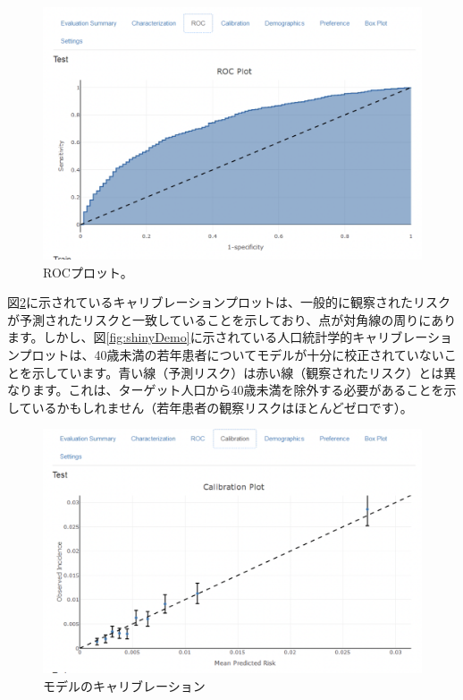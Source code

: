 \documentclass[
  11pt]{book}
\theoremstyle{definition}
\theoremstyle{definition}
\theoremstyle{definition}
\theoremstyle{definition}
\theoremstyle{remark}
\begin{document}
\begin{figure}

{\centering \includegraphics[width=1\linewidth]{images/PatientLevelPrediction/shiny/singleShiny/singleShinyRoc} 

}

\caption{ROCプロット。}\label{fig:shinyROC}
\end{figure}

図\ref{fig:shinyCal}に示されているキャリブレーションプロットは、一般的に観察されたリスクが予測されたリスクと一致していることを示しており、点が対角線の周りにあります。しかし、図\ref{fig:shinyDemo}に示されている人口統計学的キャリブレーションプロットは、40歳未満の若年患者についてモデルが十分に校正されていないことを示しています。青い線（予測リスク）は赤い線（観察されたリスク）とは異なります。これは、ターゲット人口から40歳未満を除外する必要があることを示しているかもしれません（若年患者の観察リスクはほとんどゼロです）。

\begin{figure}

{\centering \includegraphics[width=1\linewidth]{images/PatientLevelPrediction/shiny/singleShiny/singleShinyCal} 

}

\caption{モデルのキャリブレーション}\label{fig:shinyCal}
\end{figure}
\end{document}
